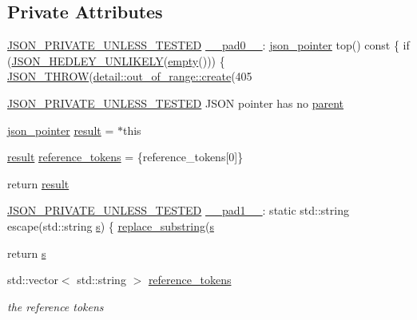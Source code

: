 \subsection*{Private Attributes}
\begin{DoxyCompactItemize}
\item 
\hyperlink{json_8hpp_a2cf645f34610e7f7d6e09ab88a2ab917}{J\+S\+O\+N\+\_\+\+P\+R\+I\+V\+A\+T\+E\+\_\+\+U\+N\+L\+E\+S\+S\+\_\+\+T\+E\+S\+T\+ED} \hyperlink{classnlohmann_1_1json__pointer_a551777cfe37bf7adb82253482030d992}{\+\_\+\+\_\+pad0\+\_\+\+\_\+}\+: \hyperlink{classnlohmann_1_1json__pointer}{json\+\_\+pointer} top() const \{ if (\hyperlink{json_8hpp_a8df7de76ab3c9445f46f6994ec205bcd}{J\+S\+O\+N\+\_\+\+H\+E\+D\+L\+E\+Y\+\_\+\+U\+N\+L\+I\+K\+E\+LY}(\hyperlink{classnlohmann_1_1json__pointer_a649252bda4a2e75a0915b11a25d8bcc3}{empty}())) \{ \hyperlink{json_8hpp_a6c274f6db2e65c1b66c7d41b06ad690f}{J\+S\+O\+N\+\_\+\+T\+H\+R\+OW}(\hyperlink{classnlohmann_1_1detail_1_1out__of__range_a3f6d82a6f967c4728a1ec735a7867073}{detail\+::out\+\_\+of\+\_\+range\+::create}(405
\item 
\hyperlink{json_8hpp_a2cf645f34610e7f7d6e09ab88a2ab917}{J\+S\+O\+N\+\_\+\+P\+R\+I\+V\+A\+T\+E\+\_\+\+U\+N\+L\+E\+S\+S\+\_\+\+T\+E\+S\+T\+ED} J\+S\+ON pointer has no \hyperlink{classnlohmann_1_1json__pointer_a9d826fc24f7821325e4f24d4393d6adc}{parent}
\item 
\hyperlink{classnlohmann_1_1json__pointer}{json\+\_\+pointer} \hyperlink{classnlohmann_1_1json__pointer_ae3d35f4085faec07b87c88ba0dae457d}{result} = $\ast$this
\item 
\hyperlink{classnlohmann_1_1json__pointer_ae3d35f4085faec07b87c88ba0dae457d}{result} \hyperlink{classnlohmann_1_1json__pointer_a468dde132b1384d962c75eca7306f6cb}{reference\+\_\+tokens} = \{reference\+\_\+tokens\mbox{[}0\mbox{]}\}
\item 
return \hyperlink{classnlohmann_1_1json__pointer_a8473b794a810d3fdb46cf985bfa9e2bb}{result}
\item 
\hyperlink{json_8hpp_a2cf645f34610e7f7d6e09ab88a2ab917}{J\+S\+O\+N\+\_\+\+P\+R\+I\+V\+A\+T\+E\+\_\+\+U\+N\+L\+E\+S\+S\+\_\+\+T\+E\+S\+T\+ED} \hyperlink{classnlohmann_1_1json__pointer_ad43ed35055f2aa668d505affcccc8a11}{\+\_\+\+\_\+pad1\+\_\+\+\_\+}\+: static std\+::string escape(std\+::string \hyperlink{classnlohmann_1_1json__pointer_a40846302040a443256386bfa258ea061}{s}) \{ \hyperlink{classnlohmann_1_1json__pointer_aa7649d30da9fc10b0e20704a27aea2a9}{replace\+\_\+substring}(\hyperlink{classnlohmann_1_1json__pointer_a40846302040a443256386bfa258ea061}{s}
\item 
return \hyperlink{classnlohmann_1_1json__pointer_a40846302040a443256386bfa258ea061}{s}
\item 
std\+::vector$<$ std\+::string $>$ \hyperlink{classnlohmann_1_1json__pointer_a07a990a6838de4f38ee9d881e7b9fd61}{reference\+\_\+tokens}
\begin{DoxyCompactList}\small\item\em the reference tokens \end{DoxyCompactList}\end{DoxyCompactItemize}
